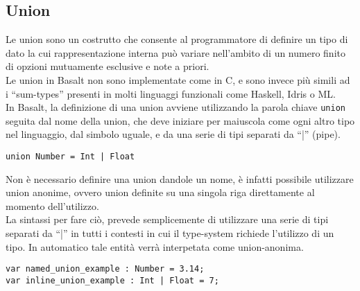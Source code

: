 \subsection{Union}
Le union sono un costrutto che consente al programmatore di definire un tipo di dato la cui rappresentazione 
interna può variare nell’ambito di un numero finito di opzioni mutuamente esclusive e note a priori. \\ 

Le union in Basalt non sono implementate come in C, e sono invece più simili ad i “sum-types” presenti in molti 
linguaggi funzionali come Haskell, Idris o ML. \\

In Basalt, la definizione di una union avviene utilizzando la parola chiave \texttt{union} seguita dal nome della union, 
che deve iniziare per maiuscola come ogni altro tipo nel linguaggio, dal simbolo uguale, 
e da una serie di tipi separati da “|” (pipe). \\

\vspace{0.5cm}
\begin{lstlisting}[frame=single]
union Number = Int | Float
\end{lstlisting}
\vspace{0.5cm}

Non è necessario definire una union dandole un nome, è infatti possibile utilizzare union anonime, 
ovvero union definite su una singola riga direttamente al momento dell’utilizzo. \\

La sintassi per fare ciò, prevede semplicemente di utilizzare  una serie di tipi separati da “|”
in tutti i contesti in cui il type-system richiede l’utilizzo di un tipo. In automatico 
tale entità verrà interpetata come union-anonima. \\

\vspace{0.5cm}
\begin{lstlisting}[frame=single]
var named_union_example : Number = 3.14;     
var inline_union_example : Int | Float = 7;
\end{lstlisting}
\vspace{0.5cm}

 
\newpage

 
\newpage


 
 
\newpage
